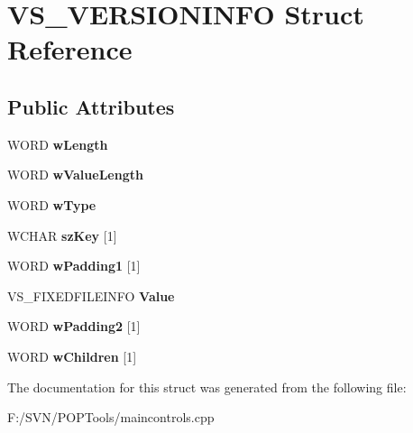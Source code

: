 \hypertarget{struct_v_s___v_e_r_s_i_o_n_i_n_f_o}{\section{V\-S\-\_\-\-V\-E\-R\-S\-I\-O\-N\-I\-N\-F\-O Struct Reference}
\label{struct_v_s___v_e_r_s_i_o_n_i_n_f_o}
}
\subsection*{Public Attributes}
\begin{DoxyCompactItemize}
\item 
\hypertarget{struct_v_s___v_e_r_s_i_o_n_i_n_f_o_a0e6c4a9d1ec323cbd2be7cf19ebc31bc}{W\-O\-R\-D {\bfseries w\-Length}}\label{struct_v_s___v_e_r_s_i_o_n_i_n_f_o_a0e6c4a9d1ec323cbd2be7cf19ebc31bc}

\item 
\hypertarget{struct_v_s___v_e_r_s_i_o_n_i_n_f_o_a66e7ff0259f771a616584fffab46e5b3}{W\-O\-R\-D {\bfseries w\-Value\-Length}}\label{struct_v_s___v_e_r_s_i_o_n_i_n_f_o_a66e7ff0259f771a616584fffab46e5b3}

\item 
\hypertarget{struct_v_s___v_e_r_s_i_o_n_i_n_f_o_a69c928d7b7265a5ed79224c98f516386}{W\-O\-R\-D {\bfseries w\-Type}}\label{struct_v_s___v_e_r_s_i_o_n_i_n_f_o_a69c928d7b7265a5ed79224c98f516386}

\item 
\hypertarget{struct_v_s___v_e_r_s_i_o_n_i_n_f_o_abd87f81d1d50f461495c3537210f1fbb}{W\-C\-H\-A\-R {\bfseries sz\-Key} \mbox{[}1\mbox{]}}\label{struct_v_s___v_e_r_s_i_o_n_i_n_f_o_abd87f81d1d50f461495c3537210f1fbb}

\item 
\hypertarget{struct_v_s___v_e_r_s_i_o_n_i_n_f_o_a685b6a50b57048cd09c04ba00ffcb20a}{W\-O\-R\-D {\bfseries w\-Padding1} \mbox{[}1\mbox{]}}\label{struct_v_s___v_e_r_s_i_o_n_i_n_f_o_a685b6a50b57048cd09c04ba00ffcb20a}

\item 
\hypertarget{struct_v_s___v_e_r_s_i_o_n_i_n_f_o_ac63f745070711b78accc62ef6828c3f2}{V\-S\-\_\-\-F\-I\-X\-E\-D\-F\-I\-L\-E\-I\-N\-F\-O {\bfseries Value}}\label{struct_v_s___v_e_r_s_i_o_n_i_n_f_o_ac63f745070711b78accc62ef6828c3f2}

\item 
\hypertarget{struct_v_s___v_e_r_s_i_o_n_i_n_f_o_a7cd1adf0d107015502904dc69927725b}{W\-O\-R\-D {\bfseries w\-Padding2} \mbox{[}1\mbox{]}}\label{struct_v_s___v_e_r_s_i_o_n_i_n_f_o_a7cd1adf0d107015502904dc69927725b}

\item 
\hypertarget{struct_v_s___v_e_r_s_i_o_n_i_n_f_o_a9e3509c60e112d1dbbcee73f8b118d6a}{W\-O\-R\-D {\bfseries w\-Children} \mbox{[}1\mbox{]}}\label{struct_v_s___v_e_r_s_i_o_n_i_n_f_o_a9e3509c60e112d1dbbcee73f8b118d6a}

\end{DoxyCompactItemize}


The documentation for this struct was generated from the following file\-:\begin{DoxyCompactItemize}
\item 
F\-:/\-S\-V\-N/\-P\-O\-P\-Tools/maincontrols.\-cpp\end{DoxyCompactItemize}
